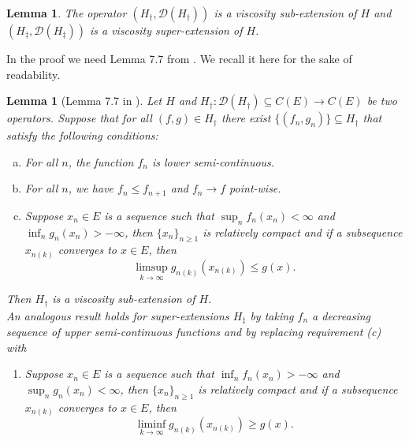 \documentclass[a4paper]{article}
\newcommand{\cD}{\mathcal{D}}
\numberwithin{equation}{section}
\newtheorem{lemma}[theorem]{Lemma}
\theoremstyle{definition}
\begin{document}
\begin{lemma} \label{lemma:viscosity_extension}
	The operator $(H_\dagger,\cD(H_\dagger))$ is a viscosity sub-extension of $H$ and $(H_\ddagger,\cD(H_\ddagger))$ is a viscosity super-extension of $H$.
\end{lemma}

In the proof we need Lemma 7.7 from \cite{FK06}. We recall it here for the sake of readability.
\begin{lemma}[Lemma 7.7 in \cite{FK06}] \label{lemma:extension_lemma_7.7inFK}
	Let $H$ and $H_\dagger : \cD(H_\dagger) \subseteq C(E) \rightarrow  C(E)$ be two operators. Suppose that for all $(f,g) \in H_\dagger$ there exist $\{(f_n,g_n)\} \subseteq H_\dagger$ that satisfy the following conditions:
	\begin{enumerate}[(a)]
		\item For all $n$, the function $f_n$ is lower semi-continuous.
		\item For all $n$, we have $f_n \leq f_{n+1}$ and $f_n \rightarrow f$ point-wise.
		\item Suppose $x_n \in E$ is a sequence such that $\sup_n f_n(x_n) < \infty$ and $\inf_n g_n(x_n) > - \infty$, then $\{x_n\}_{n \geq 1}$ is relatively compact and if a subsequence $x_{n(k)}$ converges to $x \in E$, then
		\begin{equation*}
			\limsup_{k \rightarrow \infty} g_{n(k)}(x_{n(k)}) \leq g(x).
		\end{equation*}
	\end{enumerate}
	Then $H_\dagger$ is a viscosity sub-extension of $H$.\\
	An analogous result holds for super-extensions $H_{\ddagger}$ by taking $f_n$ a decreasing sequence of upper semi-continuous functions and by replacing requirement (c) with
	\begin{enumerate}
		\item[(c$^{\prime}$)] Suppose $x_n \in E$ is a sequence such that $\inf_n f_n(x_n) > - \infty$ and $\sup_n g_n(x_n) <  \infty$, then $\{x_n\}_{n \geq 1}$ is relatively compact and if a subsequence $x_{n(k)}$ converges to $x \in E$, then
		\begin{equation*}
			\liminf_{k \rightarrow \infty} g_{n(k)}(x_{n(k)}) \geq g(x).
		\end{equation*}
	\end{enumerate} 
\end{lemma}
\end{document}
